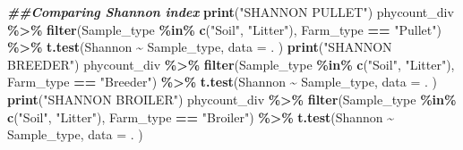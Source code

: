 \documentclass[
]{article}
\newenvironment{Shaded}{\begin{snugshade}}{\end{snugshade}}
\newcommand{\AttributeTok}[1]{\textcolor[rgb]{0.13,0.29,0.53}{#1}}
\newcommand{\DocumentationTok}[1]{\textcolor[rgb]{0.56,0.35,0.01}{\textbf{\textit{#1}}}}
\newcommand{\FunctionTok}[1]{\textcolor[rgb]{0.13,0.29,0.53}{\textbf{#1}}}
\newcommand{\NormalTok}[1]{#1}
\newcommand{\SpecialCharTok}[1]{\textcolor[rgb]{0.81,0.36,0.00}{\textbf{#1}}}
\newcommand{\StringTok}[1]{\textcolor[rgb]{0.31,0.60,0.02}{#1}}
\begin{document}
\begin{Shaded}
\begin{Highlighting}[]
   
   \DocumentationTok{\#\#Comparing Shannon index}
   \FunctionTok{print}\NormalTok{(}\StringTok{"SHANNON PULLET"}\NormalTok{)}
\NormalTok{   phycount\_div }\SpecialCharTok{\%\textgreater{}\%}
     \FunctionTok{filter}\NormalTok{(Sample\_type }\SpecialCharTok{\%in\%} \FunctionTok{c}\NormalTok{(}\StringTok{"Soil"}\NormalTok{, }\StringTok{"Litter"}\NormalTok{),}
\NormalTok{            Farm\_type }\SpecialCharTok{==} \StringTok{"Pullet"}\NormalTok{) }\SpecialCharTok{\%\textgreater{}\%}
     \FunctionTok{t.test}\NormalTok{(Shannon }\SpecialCharTok{\textasciitilde{}}\NormalTok{ Sample\_type, }
          \AttributeTok{data =}\NormalTok{ .}
\NormalTok{          )}
   \FunctionTok{print}\NormalTok{(}\StringTok{"SHANNON BREEDER"}\NormalTok{)}
\NormalTok{   phycount\_div }\SpecialCharTok{\%\textgreater{}\%}
     \FunctionTok{filter}\NormalTok{(Sample\_type }\SpecialCharTok{\%in\%} \FunctionTok{c}\NormalTok{(}\StringTok{"Soil"}\NormalTok{, }\StringTok{"Litter"}\NormalTok{),}
\NormalTok{            Farm\_type }\SpecialCharTok{==} \StringTok{"Breeder"}\NormalTok{) }\SpecialCharTok{\%\textgreater{}\%}
    \FunctionTok{t.test}\NormalTok{(Shannon }\SpecialCharTok{\textasciitilde{}}\NormalTok{ Sample\_type,}
         \AttributeTok{data =}\NormalTok{ .}
\NormalTok{         )}
  \FunctionTok{print}\NormalTok{(}\StringTok{"SHANNON BROILER"}\NormalTok{)}
\NormalTok{  phycount\_div }\SpecialCharTok{\%\textgreater{}\%}
    \FunctionTok{filter}\NormalTok{(Sample\_type }\SpecialCharTok{\%in\%} \FunctionTok{c}\NormalTok{(}\StringTok{"Soil"}\NormalTok{, }\StringTok{"Litter"}\NormalTok{),}
\NormalTok{           Farm\_type }\SpecialCharTok{==} \StringTok{"Broiler"}\NormalTok{) }\SpecialCharTok{\%\textgreater{}\%}
    \FunctionTok{t.test}\NormalTok{(Shannon }\SpecialCharTok{\textasciitilde{}}\NormalTok{ Sample\_type,}
         \AttributeTok{data =}\NormalTok{ .}
\NormalTok{         )}


\end{Highlighting}
\end{Shaded}
\end{document}
